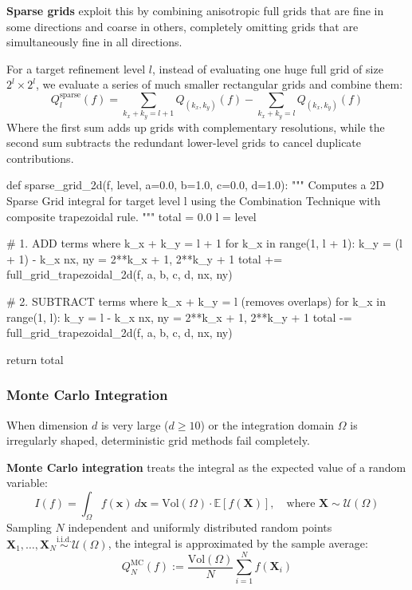 \begin{definition}
     \textbf{Sparse grids} exploit this by combining anisotropic full grids that are fine in some directions and coarse in others, completely omitting grids that are simultaneously fine in all directions.
\end{definition}

\begin{theorem}
    For a target refinement level $l$, instead of evaluating one huge full grid of size $2^l \times 2^l$, we evaluate a series of much smaller rectangular grids and combine them:
    $$Q_l^{\text{sparse}}(f) = \sum_{k_x + k_y = l + 1} Q_{(k_x, k_y)}(f) - \sum_{k_x + k_y = l} Q_{(k_x, k_y)}(f)$$
    Where the first sum adds up grids with complementary resolutions, while the second sum subtracts the redundant lower-level grids to cancel duplicate contributions.
\end{theorem}

\begin{codeexample}
def sparse_grid_2d(f, level, a=0.0, b=1.0, c=0.0, d=1.0):
    """
    Computes a 2D Sparse Grid integral for target level l
    using the Combination Technique with composite trapezoidal rule.
    """
    total = 0.0
    l = level
    
    # 1. ADD terms where k_x + k_y = l + 1
    for k_x in range(1, l + 1):
        k_y = (l + 1) - k_x
        nx, ny = 2**k_x + 1, 2**k_y + 1
        total += full_grid_trapezoidal_2d(f, a, b, c, d, nx, ny)
        
    # 2. SUBTRACT terms where k_x + k_y = l (removes overlaps)
    for k_x in range(1, l):
        k_y = l - k_x
        nx, ny = 2**k_x + 1, 2**k_y + 1
        total -= full_grid_trapezoidal_2d(f, a, b, c, d, nx, ny)
        
    return total
\end{codeexample}

\subsubsection{Monte Carlo Integration}

\begin{remark}
    When dimension $d$ is very large ($d \ge 10$) or the integration domain $\Omega$ is irregularly shaped, deterministic grid methods fail completely.
\end{remark}

\begin{definition}
    \textbf{Monte Carlo integration} treats the integral as the expected value of a random variable:
    $$I(f) = \int_{\Omega} f(\mathbf{x}) \, d\mathbf{x} = \text{Vol}(\Omega) \cdot \mathbb{E}[f(\mathbf{X})], \quad \text{where } \mathbf{X} \sim \mathcal{U}(\Omega)$$
    Sampling $N$ independent and uniformly distributed random points $\mathbf{X}_1, \dots, \mathbf{X}_N \overset{\text{i.i.d.}}{\sim} \mathcal{U}(\Omega)$, the integral is approximated by the sample average:
    $$Q_N^{\text{MC}}(f) := \frac{\text{Vol}(\Omega)}{N} \sum_{i=1}^N f(\mathbf{X}_i)$$
\end{definition}

